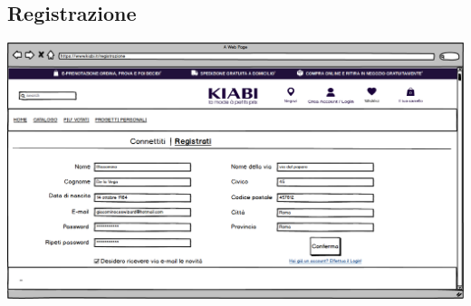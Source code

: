 \documentclass[12pt,italian,]{report}
\begin{document}
\subsection{Registrazione} 
\includegraphics{balsamiq/Registrazione.png}
\end{document}
